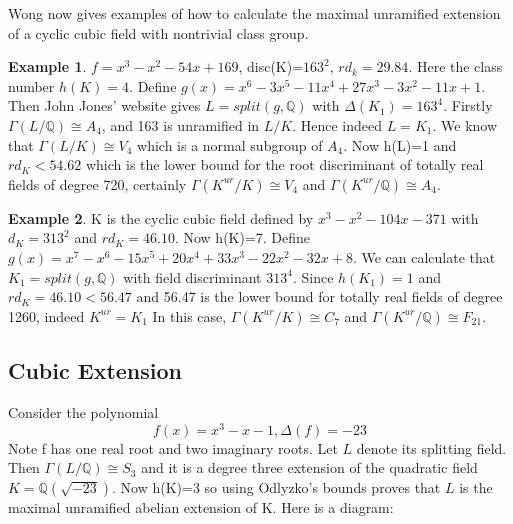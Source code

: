 \documentclass[12pt]{extarticle}
\newcommand{\Q}{\mathbb{Q}}
\newcommand{\<}{\langle}
\renewcommand{\>}{\rangle}
\theoremstyle{definition}
\newtheorem*{example}{Example}
\begin{document}
Wong now gives examples of how to calculate the maximal unramified extension of a cyclic cubic field with nontrivial class group. \begin{example}
    $f=x^3-x^2-54x+169$, disc(K)=$163^2$, $rd_{k}=29.84$. Here 
     the class number $h(K)=4$. Define $g(x)=x^6-3x^5-11x^4+27x^3-3x^2-11x+1$. Then John Jones' website gives $L = split(g,\Q)$ with $\Delta(K_1)=163^4$. Firstly $\Gamma(L/\Q) \cong A_4$, and 163 is unramified in $L/K$. Hence indeed $L=K_1$. We know that $\Gamma(L/K)\cong V_4$ which is a normal subgroup of $A_4$. Now h(L)=1 and $rd_K < 54.62$ which is the lower bound for the root discriminant of totally real fields of degree 720, certainly $\Gamma(K^{ur}/K) \cong V_4$ and $\Gamma(K^{ur}/\Q) \cong A_4$. 
\end{example}
\begin{example}
K is the cyclic cubic field defined by $x^3-x^2-104x-371$ with $d_K = 313^2$
and $rd_{K} = 46.10$. Now h(K)=7. Define $g(x) = x^7-x^6-15x^5+20x^4+33x^3-22x^2-32x+8$. We can calculate that $K_1=split(g,\Q)$ with field discriminant $313^4$. Since $h(K_1) = 1$ and $rd_K = 46.10 < 56.47$ and 56.47 is the lower
bound for totally real fields of degree 1260, indeed $K^{ur}=K_1$ In this
case, $\Gamma(K^{ur}/K) \cong C_7$ and $\Gamma(K^{ur}/\Q) \cong F_{21} $.  
\end{example}
\subsection{Cubic Extension}
Consider the polynomial \begin{equation}
 f(x)=x^3-x-1, \Delta(f)=-23
\end{equation}
Note f has one real root and two imaginary roots. Let $L$ denote its splitting field. Then $\Gamma(L/\Q)\cong S_3$ and it is a degree three extension of the quadratic field $K= \Q(\sqrt{-23})$. Now h(K)=3 so using Odlyzko's bounds proves that $L$ is the maximal unramified abelian extension of K. Here is a diagram:
\begin{center}
\end{center}
\end{document}
